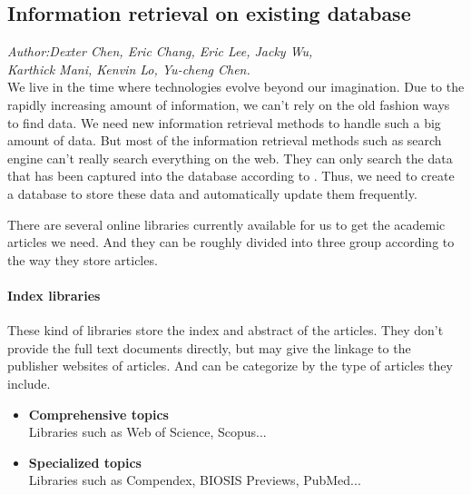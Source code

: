 	
\subsection{Information retrieval on existing database}
\textit{\footnotesize Author:Dexter Chen, Eric Chang, Eric Lee, Jacky Wu,\\ 
	Karthick Mani, Kenvin Lo, Yu-cheng Chen.}\\

We live in the time where technologies evolve beyond our imagination. Due to the rapidly increasing amount of information, we can't rely on the old fashion ways to find data. We need new information retrieval methods to handle such a big amount of data. But most of the information retrieval methods such as search engine can't really search everything on the web. They can only search the data that has been captured into the database according to \cite{Grehan}. Thus, we need to create a database to store these data and automatically update them frequently.

There are several online libraries currently available for us to get the academic articles we need. And they can be roughly divided into three group according to the way they store articles.
\paragraph{Index libraries}
	These kind of libraries store the index and abstract of the articles. They don't provide the full text documents directly, but may give the linkage to the publisher websites of articles. And can be categorize by the type of articles they include.
	\begin{itemize}
		\item\textbf{Comprehensive topics}\\Libraries such as Web of Science, Scopus...
		\item\textbf{Specialized topics}\\Libraries such as Compendex, BIOSIS Previews, PubMed...
	\end{itemize}
